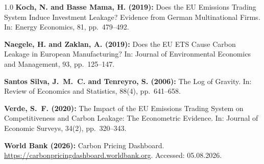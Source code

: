 \documentclass[12pt,a4paper]{article}
\begin{document}
\begin{spacing}{1.0}
\textbf{Koch, N. and Basse Mama, H. (2019):} Does the EU Emissions Trading System Induce Investment Leakage? Evidence from German Multinational Firms. In: Energy Economics, 81, pp.\ 479--492.

\textbf{Naegele, H. and Zaklan, A. (2019):} Does the EU ETS Cause Carbon Leakage in European Manufacturing? In: Journal of Environmental Economics and Management, 93, pp.\ 125--147.

\textbf{Santos Silva, J.\ M.\ C. and Tenreyro, S. (2006):} The Log of Gravity. In: Review of Economics and Statistics, 88(4), pp.\ 641--658.

\textbf{Verde, S.\ F. (2020):} The Impact of the EU Emissions Trading System on Competitiveness and Carbon Leakage: The Econometric Evidence. In: Journal of Economic Surveys, 34(2), pp.\ 320--343.

\textbf{World Bank (2026):} Carbon Pricing Dashboard. \url{https://carbonpricingdashboard.worldbank.org}. Accessed: 05.08.2026.

\end{spacing}
\end{document}
